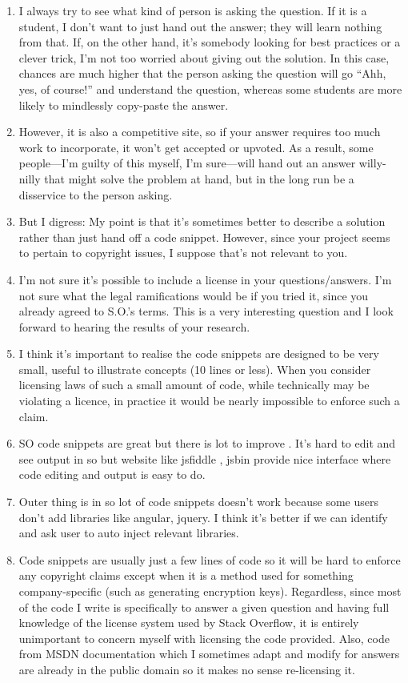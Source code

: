 \documentclass{svjour3}                     %
\begin{document}
\begin{enumerate}
	\item I always try to see what kind of person is asking the question. If it is a student, I don't want to just hand out the answer; they will learn nothing from that. If, on the other hand, it's somebody looking for best practices or a clever trick, I'm not too worried about giving out the solution. In this case, chances are much higher that the person asking the question will go ``Ahh, yes, of course!'' and understand the question, whereas some students are more likely to mindlessly copy-paste the answer.
	\item However, it is also a competitive site, so if your answer requires too much work to incorporate, it won't get accepted or upvoted. As a result, some people---I'm guilty of this myself, I'm sure---will hand out an answer willy-nilly that might solve the problem at hand, but in the long run be a disservice to the person asking.
	\item But I digress: My point is that it's sometimes better to describe a solution rather than just hand off a code snippet. However, since your project seems to pertain to copyright issues, I suppose that's not relevant to you.
	\item I'm not sure it's possible to include a license in your questions/answers. I'm not sure what the legal ramifications would be if you tried it, since you already agreed to S.O.'s terms. This is a very interesting question and I look forward to hearing the results of your research.
	\item I think it's important to realise the code snippets are designed to be very small, useful to illustrate concepts (10 lines or less). When you consider licensing laws of such a small amount of code, while technically may be violating a licence, in practice it would be nearly impossible to enforce such a claim.
	\item SO code snippets are great but there is lot to improve . It's hard to edit and see output in so but website like jsfiddle , jsbin provide nice interface where code editing and output is easy to do.
	\item Outer thing is in so lot of code snippets doesn't work because some users don't add libraries like angular, jquery. I think it's better if we can identify and ask user to auto inject relevant libraries.
	\item Code snippets are usually just a few lines of code so it will be hard to enforce any copyright claims except when it is a method used for something company-specific (such as generating encryption keys). Regardless, since most of the code I write is specifically to answer a given question and having full knowledge of the license system used by Stack Overflow, it is entirely unimportant to concern myself with licensing the code provided. Also, code from MSDN documentation which I sometimes adapt and modify for answers are already in the public domain so it makes no sense re-licensing it.

\end{enumerate}
\end{document}
